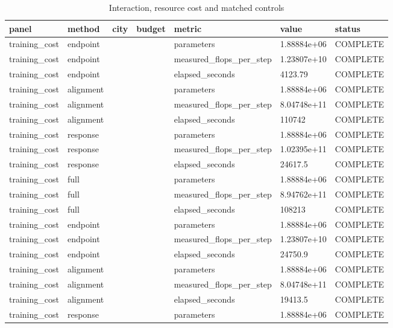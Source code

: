 \begin{longtable}{lllllll}
\caption{Interaction, resource cost and matched controls}\\
\toprule
panel & method & city & budget & metric & value & status \\
\midrule\endhead
training\_cost & endpoint &  &  & parameters & 1.88884e+06 & COMPLETE \\
training\_cost & endpoint &  &  & measured\_flops\_per\_step & 1.23807e+10 & COMPLETE \\
training\_cost & endpoint &  &  & elapsed\_seconds & 4123.79 & COMPLETE \\
training\_cost & alignment &  &  & parameters & 1.88884e+06 & COMPLETE \\
training\_cost & alignment &  &  & measured\_flops\_per\_step & 8.04748e+11 & COMPLETE \\
training\_cost & alignment &  &  & elapsed\_seconds & 110742 & COMPLETE \\
training\_cost & response &  &  & parameters & 1.88884e+06 & COMPLETE \\
training\_cost & response &  &  & measured\_flops\_per\_step & 1.02395e+11 & COMPLETE \\
training\_cost & response &  &  & elapsed\_seconds & 24617.5 & COMPLETE \\
training\_cost & full &  &  & parameters & 1.88884e+06 & COMPLETE \\
training\_cost & full &  &  & measured\_flops\_per\_step & 8.94762e+11 & COMPLETE \\
training\_cost & full &  &  & elapsed\_seconds & 108213 & COMPLETE \\
training\_cost & endpoint &  &  & parameters & 1.88884e+06 & COMPLETE \\
training\_cost & endpoint &  &  & measured\_flops\_per\_step & 1.23807e+10 & COMPLETE \\
training\_cost & endpoint &  &  & elapsed\_seconds & 24750.9 & COMPLETE \\
training\_cost & alignment &  &  & parameters & 1.88884e+06 & COMPLETE \\
training\_cost & alignment &  &  & measured\_flops\_per\_step & 8.04748e+11 & COMPLETE \\
training\_cost & alignment &  &  & elapsed\_seconds & 19413.5 & COMPLETE \\
training\_cost & response &  &  & parameters & 1.88884e+06 & COMPLETE \\

\end{longtable}
